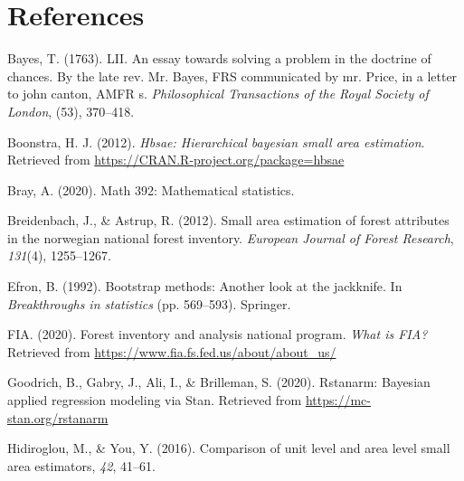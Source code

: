 \documentclass[12pt,twoside]{reedthesis}
\newlength{\cslhangindent}
\newenvironment{CSLReferences}[2] %
 {%
  \setlength{\parindent}{0pt}
  \ifodd #1 \everypar{\setlength{\hangindent}{\cslhangindent}}\ignorespaces\fi
  \ifnum #2 > 0
  \setlength{\parskip}{#2\baselineskip}
  \fi
 }%
 {}
\begin{document}
\hypertarget{references}{%
\chapter*{References}\label{references}}


\noindent

\setlength{\parindent}{-0.20in}
\setlength{\leftskip}{0.20in}
\setlength{\parskip}{8pt}

\hypertarget{refs}{}
\begin{CSLReferences}{1}{0}
\leavevmode{}%
Bayes, T. (1763). LII. An essay towards solving a problem in the doctrine of chances. By the late rev. Mr. Bayes, FRS communicated by mr. Price, in a letter to john canton, AMFR s. \emph{Philosophical Transactions of the Royal Society of London}, (53), 370--418.

\leavevmode{}%
Boonstra, H. J. (2012). \emph{Hbsae: Hierarchical bayesian small area estimation}. Retrieved from \url{https://CRAN.R-project.org/package=hbsae}

\leavevmode{}%
Bray, A. (2020). Math 392: Mathematical statistics.

\leavevmode{}%
Breidenbach, J., \& Astrup, R. (2012). Small area estimation of forest attributes in the norwegian national forest inventory. \emph{European Journal of Forest Research}, \emph{131}(4), 1255--1267.

\leavevmode{}%
Efron, B. (1992). Bootstrap methods: Another look at the jackknife. In \emph{Breakthroughs in statistics} (pp. 569--593). Springer.

\leavevmode{}%
FIA. (2020). Forest inventory and analysis national program. \emph{What is FIA?} Retrieved from \url{https://www.fia.fs.fed.us/about/about_us/}

\leavevmode{}%
Goodrich, B., Gabry, J., Ali, I., \& Brilleman, S. (2020). Rstanarm: {Bayesian} applied regression modeling via {Stan}. Retrieved from \url{https://mc-stan.org/rstanarm}

\leavevmode{}%
Hidiroglou, M., \& You, Y. (2016). Comparison of unit level and area level small area estimators, \emph{42}, 41--61.


\end{CSLReferences}
\end{document}
